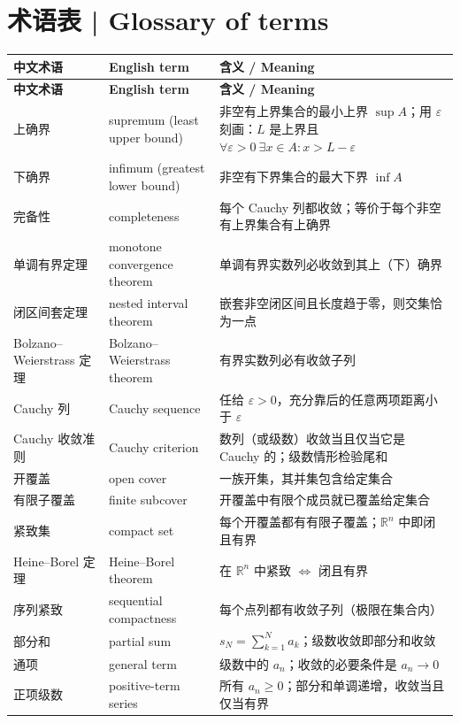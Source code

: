 \documentclass[UTF8,11pt,a4paper]{ctexart}
\begin{document}
\section*{术语表 | Glossary of terms}
\begingroup\small
\begin{longtable}{@{}p{3.4cm}p{5.4cm}p{7.0cm}@{}}
\toprule
\textbf{中文术语} & \textbf{English term} & \textbf{含义 / Meaning}\\
\midrule
\endfirsthead
\toprule
\textbf{中文术语} & \textbf{English term} & \textbf{含义 / Meaning}\\
\midrule
\endhead
\bottomrule
\endlastfoot
上确界 & supremum (least upper bound) & 非空有上界集合的最小上界 $\sup A$；用 $\varepsilon$ 刻画：$L$ 是上界且 $\forall\varepsilon>0\ \exists x\in A:x>L-\varepsilon$\\
下确界 & infimum (greatest lower bound) & 非空有下界集合的最大下界 $\inf A$\\
完备性 & completeness & 每个 Cauchy 列都收敛；等价于每个非空有上界集合有上确界\\
单调有界定理 & monotone convergence theorem & 单调有界实数列必收敛到其上（下）确界\\
闭区间套定理 & nested interval theorem & 嵌套非空闭区间且长度趋于零，则交集恰为一点\\
Bolzano--Weierstrass 定理 & Bolzano--Weierstrass theorem & 有界实数列必有收敛子列\\
Cauchy 列 & Cauchy sequence & 任给 $\varepsilon>0$，充分靠后的任意两项距离小于 $\varepsilon$\\
Cauchy 收敛准则 & Cauchy criterion & 数列（或级数）收敛当且仅当它是 Cauchy 的；级数情形检验尾和\\
开覆盖 & open cover & 一族开集，其并集包含给定集合\\
有限子覆盖 & finite subcover & 开覆盖中有限个成员就已覆盖给定集合\\
紧致集 & compact set & 每个开覆盖都有有限子覆盖；$\mathbb R^n$ 中即闭且有界\\
Heine--Borel 定理 & Heine--Borel theorem & 在 $\mathbb R^n$ 中紧致 $\Leftrightarrow$ 闭且有界\\
序列紧致 & sequential compactness & 每个点列都有收敛子列（极限在集合内）\\
部分和 & partial sum & $s_N=\sum_{k=1}^{N}a_k$；级数收敛即部分和收敛\\
通项 & general term & 级数中的 $a_n$；收敛的必要条件是 $a_n\to0$\\
正项级数 & positive-term series & 所有 $a_n\ge0$；部分和单调递增，收敛当且仅当有界\\

\end{longtable}
\end{document}
